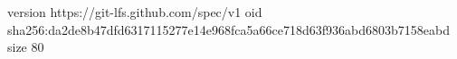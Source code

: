 version https://git-lfs.github.com/spec/v1
oid sha256:da2de8b47dfd6317115277e14e968fca5a66ce718d63f936abd6803b7158eabd
size 80
